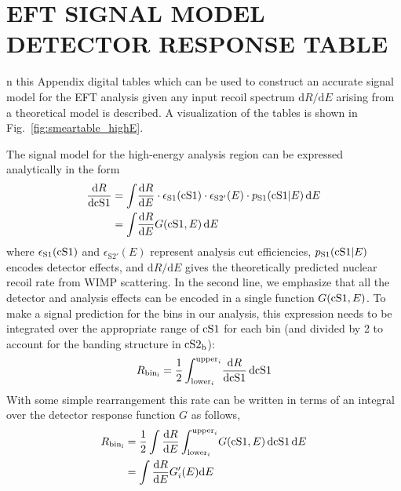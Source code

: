 %
%

\chapter{EFT SIGNAL MODEL DETECTOR RESPONSE TABLE}
\label{app:response_table}

n this Appendix digital tables which can be used to construct an accurate signal model for the EFT analysis given any input recoil spectrum $\mathrm{d}R/\mathrm{d}E$ arising from a theoretical model is described. A visualization of the tables is shown in Fig.~\ref{fig:smeartable_highE}.

The signal model for the high-energy analysis region can be expressed analytically in the form
%
\begin{align}
\label{eq:high2D}
  \frac{\mathrm{d} R}{\mathrm{d}\mathrm{cS1}} &= \int \! \frac{\mathrm{d}R}{\mathrm{d}E} \cdot \epsilon_\mathrm{S1}(\mathrm{cS1}) \cdot \epsilon_\mathrm{S2'}(E) \cdot p_\mathrm{S1}(\mathrm{\mathrm{cS1}}|E) \, \mathrm{d}E \\
  &= \int \! \frac{\mathrm{d}R}{\mathrm{d}E} G(\mathrm{cS1},E) \, \mathrm{d}E
\end{align}
%
where $\epsilon_\mathrm{S1}(\mathrm{cS1})$ and $\epsilon_\mathrm{S2'}(E)$ represent analysis cut efficiencies, $p_\mathrm{S1}(\mathrm{\mathrm{cS1}}|E)$ encodes detector effects, and $\mathrm{d}R/\mathrm{d}E$ gives the theoretically predicted nuclear recoil rate from WIMP scattering. In the second line, we emphasize that all the detector and analysis effects can be encoded in a single function $G(\mathrm{cS1},E)$. To make a signal prediction for the bins in our analysis, this expression needs to be integrated over the appropriate range of $\mathrm{cS1}$ for each bin (and divided by 2 to account for the banding structure in $\mathrm{cS2}_\mathrm{b}$):
%
\begin{equation}
  R_\mathrm{bin_i} = \frac{1}{2}\int_{\mathrm{lower}_i}^{\mathrm{upper}_i} \! \frac{\mathrm{d} R}{\mathrm{d}\mathrm{cS1}} \, \mathrm{d}\mathrm{cS1}
\end{equation}
%
With some simple rearrangement this rate can be written in terms of an integral over the detector response function $G$ as follows,
%
\begin{align}
  R_\mathrm{bin_i} &= \frac{1}{2}\int\frac{\mathrm{d} R}{\mathrm{d}E}\int_{\mathrm{lower}_i}^{\mathrm{upper}_i} \! G(\mathrm{cS1},E) \, \mathrm{d}\mathrm{cS1} \, \mathrm{d}E \\
 &= \int\frac{\mathrm{d} R}{\mathrm{d}E} G'_i(E) \mathrm{d}E
\end{align}
